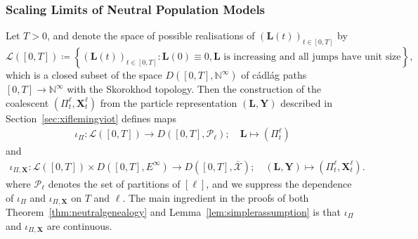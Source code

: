\documentclass[reqno,draft]{amsart}
\numberwithin{equation}{section}
\theoremstyle{plain}
\theoremstyle{remark}
\newcommand{\N}{\mathbb{N}} %
\newcommand{\fpart}{\Pi} %
\begin{document}
\subsubsection{Scaling Limits of Neutral Population Models}
Let $T > 0$, and denote the space of possible realisations of $(\boldsymbol L(t))_{t\in [0,T]}$ by
\[
    \mathcal{L}([0,T]) \coloneqq \left\{ (\boldsymbol L(t))_{t\in [0,T]} \colon  \boldsymbol L(0) \equiv 0, \textrm{$\boldsymbol L$ is increasing and all jumps have unit size} \right\},
\] which is a closed subset of the space $D([0,T],\N^\infty)$ of c\'adl\'ag paths $[0,T] \to \N^\infty$ with the Skorokhod topology. Then the construction of the coalescent $(\fpart^{\ell}_t,\boldsymbol X^{\ell}_t)$ from the particle representation $(\boldsymbol L,\boldsymbol Y)$ described in Section~\ref{sec:xiflemingviot} defines maps
\begin{align}\label{eq:defcoalmaps}
    \iota_\fpart\colon \mathcal{L}([0,T]) \to D([0,T],\mathcal{P}_\ell);\quad \boldsymbol L \mapsto (\fpart_t^\ell)
\end{align}
and
\begin{align}
    \iota_{\fpart,\boldsymbol X}\colon \mathcal{L}([0,T]) \times D([0,T],E^\infty) \to D([0,T],\overline{\mathcal{X}});\quad (\boldsymbol L,\boldsymbol Y) \mapsto (\fpart_t^\ell,\boldsymbol X^\ell_t).
\end{align}
where $\mathcal{P}_\ell$ denotes the set of partitions of $[\ell]$, and we suppress the dependence of $\iota_\fpart$ and $\iota_{\fpart,\boldsymbol X}$ on $T$ and $\ell$. The main ingredient in the proofs of both Theorem~\ref{thm:neutralgenealogy} and Lemma~\ref{lem:simplerassumption} is that $\iota_\fpart$ and $\iota_{\fpart,\boldsymbol X}$ are continuous.
\end{document}
